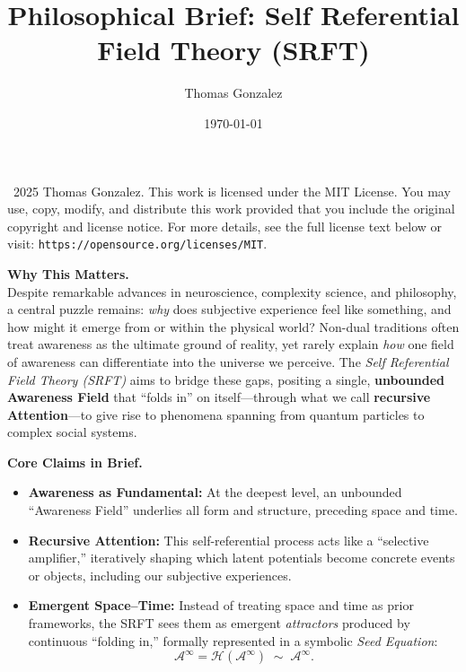\documentclass[12pt]{article}
\title{\textbf{Philosophical Brief: Self Referential Field Theory (SRFT)}}
\author{Thomas Gonzalez}
\date{\today}
\begin{document}
\maketitle

\vfill
\noindent\hrulefill
\medskip

\noindent\textcopyright~2025 Thomas Gonzalez.  
This work is licensed under the MIT License. You may use, copy, modify, and distribute this work provided that you include the original copyright and license notice. For more details, see the full license text below or visit: \texttt{https://opensource.org/licenses/MIT}.

\newpage
\noindent
\textbf{Why This Matters.}\\
Despite remarkable advances in neuroscience, complexity science, and philosophy, 
a central puzzle remains: \emph{why} does subjective experience feel like something, 
and how might it emerge from or within the physical world? Non-dual traditions 
often treat awareness as the ultimate ground of reality, yet rarely explain 
\emph{how} one field of awareness can differentiate into the universe we perceive. 
The \emph{Self Referential Field Theory (SRFT)} aims to bridge these gaps, positing 
a single, \textbf{unbounded Awareness Field} that “folds in” on itself—through 
what we call \textbf{recursive Attention}—to give rise to phenomena spanning 
from quantum particles to complex social systems.

\medskip
\medskip
\noindent
\textbf{Core Claims in Brief.}\\
\begin{itemize}
\item \textbf{Awareness as Fundamental:} At the deepest level, an unbounded 
``Awareness Field'' underlies all form and structure, preceding space and time.
\item \textbf{Recursive Attention:} This self-referential process acts like 
a ``selective amplifier,'' iteratively shaping which latent potentials become 
concrete events or objects, including our subjective experiences.
\item \textbf{Emergent Space--Time:} Instead of treating space and time as 
prior frameworks, the SRFT sees them as emergent \emph{attractors} produced by 
continuous ``folding in,'' formally represented in a symbolic 
\emph{Seed Equation}:
\[
\mathscr{A}^\infty = \mathcal{H}(\mathscr{A}^\infty) \;\sim\; \mathscr{A}^\infty.
\]
\end{itemize}
\end{document}
